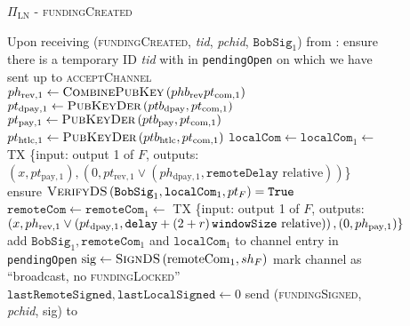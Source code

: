   \begin{figure}[H]
    \begin{protocolbox}{$\Pi_{\mathrm{LN}}$ - \textsc{fundingCreated}}
      \begin{algorithmic}[1]
        \State Upon receiving (\textsc{fundingCreated}, \textit{tid},
        \textit{pchid}, $\mathtt{BobSig}_1$) from \bob:
        \Indent
          \State ensure there is a temporary ID \textit{tid} with \bob{} in
          \texttt{pendingOpen} on which we have sent up to
          \textsc{acceptChannel}
          \State $ph_{\mathrm{rev}, 1} \gets
          \textsc{CombinePubKey}\left(phb_{\mathrm{rev}} pt_{\mathrm{com},
          1}\right)$
          \State $pt_{\mathrm{dpay}, 1} \gets
          \textsc{PubKeyDer}\left(ptb_{\mathrm{dpay}}, pt_{\mathrm{com},
          1}\right)$
          \State $pt_{\mathrm{pay}, 1} \gets
          \textsc{PubKeyDer}\left(ptb_{\mathrm{pay}}, pt_{\mathrm{com},
          1}\right)$
          \State $pt_{\mathrm{htlc}, 1} \gets
          \textsc{PubKeyDer}\left(ptb_{\mathrm{htlc}}, pt_{\mathrm{com},
          1}\right)$
          \State $\mathtt{localCom} \gets \mathtt{localCom}_1 \gets$ TX \{input:
          output 1 of $F$, outputs: $\left(x, pt_{\mathrm{pay}, 1}\right),
          \left(0, pt_{\mathrm{rev}, 1} \vee \left(ph_{\mathrm{dpay}, 1},
          \mathtt{remoteDelay} \text{ relative}\right)\right)$\}
          \State ensure $\textsc{VerifyDS}\left(\mathtt{BobSig}_1,
          \mathtt{localCom}_1, pt_F\right) = \mathtt{True}$
          \State $\mathtt{remoteCom} \gets \mathtt{remoteCom}_1 \gets$ TX
          \{input: output 1 of $F$, outputs: $\left(x, ph_{\mathrm{rev}, 1} \vee
          \left(pt_{\mathrm{dpay}, 1}, \mathtt{delay} + \left(2 + r\right)\texttt{windowSize}{} \text{
          relative}\right)\right), \left(0, ph_{\mathrm{pay}, 1}\right)\}$
          \State add $\mathtt{BobSig}_1, \mathtt{remoteCom}_1$ and
          $\mathtt{localCom}_1$ to channel entry in \texttt{pendingOpen}
          \State $\mathrm{sig} \gets \textsc{SignDS}\left(\mathrm{remoteCom}_1,
          sh_F\right)$
          \State mark channel as ``broadcast, no \textsc{fundingLocked}''
          \label{alg:protocol:open:fundingCreated:mark}
          \State $\mathtt{lastRemoteSigned}, \mathtt{lastLocalSigned} \gets 0$
          \State send (\textsc{fundingSigned}, \textit{pchid}, sig) to \bob{}
        \EndIndent
      \end{algorithmic}
    \end{protocolbox}
    \caption{}
    \label{alg:protocol:open:fundingCreated}
  \end{figure}

